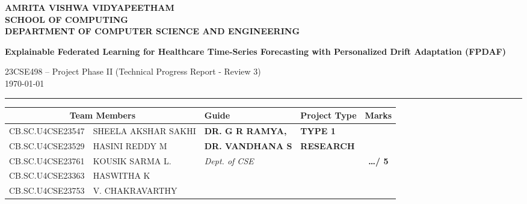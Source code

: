 \documentclass[11pt, a4paper]{article}
\begin{document}
\noindent
\begin{minipage}{\textwidth}
\centering
{\Large \textbf{\textcolor{amritaMaroon}{
AMRITA VISHWA VIDYAPEETHAM \\
SCHOOL OF COMPUTING \\
DEPARTMENT OF COMPUTER SCIENCE AND ENGINEERING}}}

\vspace{0.2cm}

{\large \textbf{Explainable Federated Learning for Healthcare Time-Series Forecasting with Personalized Drift Adaptation (FPDAF)}}

\vspace{0.1cm}
23CSE498 -- Project Phase II (Technical Progress Report - Review 3)\\
\today
\end{minipage}

\vspace{0.3cm}
\hrule
\vspace{0.3cm}

\begin{center}
\renewcommand{\arraystretch}{1.5}
\setlength{\tabcolsep}{5pt}
\begin{tabular}{|l|p{4.2cm}|p{4.2cm}|p{2.5cm}|c|}
\hline
\multicolumn{2}{|c|}{\textbf{Team Members}} & \textbf{Guide} & \textbf{Project Type} & \textbf{Marks} \\
\hline
CB.SC.U4CSE23547 & SHEELA AKSHAR SAKHI & \textbf{\small DR. G R RAMYA,} & \textbf{\small TYPE 1} &  \\ \cline{1-2}
CB.SC.U4CSE23529 & HASINI REDDY M      & \textbf{\small DR. VANDHANA S} & \textbf{\small RESEARCH} &  \\ \cline{1-2}
CB.SC.U4CSE23761 & KOUSIK SARMA L.    & \textit{\small Dept. of CSE}   & & \textbf{\huge \dots / 5} \\ \cline{1-2}
CB.SC.U4CSE23363 & HASWITHA K          & & & \\ \cline{1-2}
CB.SC.U4CSE23753 & V. CHAKRAVARTHY     & & & \\
\hline
\end{tabular}
\end{center}
\end{document}
